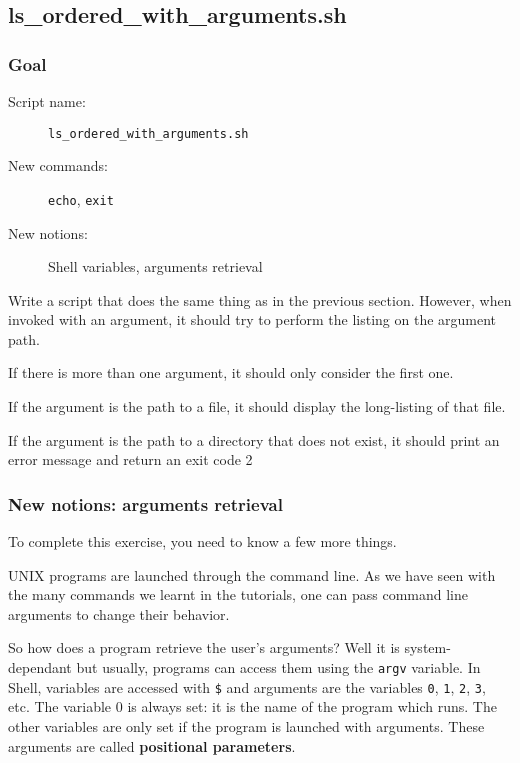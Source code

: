 \documentclass[12pt]{article}
\begin{document}
\subsection{ls\_ordered\_with\_arguments.sh}

\subsubsection{Goal}

\begin{description}
    \item[Script name:] \texttt{ls\_ordered\_with\_arguments.sh}
    \item[New commands:] \texttt{echo}, \texttt{exit}
    \item[New notions:] Shell variables, arguments retrieval

\end{description}

Write a script that does the same thing as in the previous section. However, when invoked with an argument, it should try to perform the listing on the argument path.

If there is more than one argument, it should only consider the first one.

If the argument is the path to a file, it should display the long-listing of that file.

If the argument is the path to a directory that does not exist, it should print an error message and return an exit code 2

\subsubsection{New notions: arguments retrieval}

To complete this exercise, you need to know a few more things.

UNIX programs are launched through the command line. As we have seen with the many commands we learnt in the tutorials, one can pass command line arguments to change their behavior.

So how does a program retrieve the user's arguments? Well it is system-dependant but usually, programs can access them using the \texttt{argv} variable. In Shell, variables are accessed with \texttt{\$} and arguments are the variables \texttt{0}, \texttt{1}, \texttt{2}, \texttt{3}, etc. The variable 0 is always set: it is the name of the program which runs. The other variables are only set if the program is launched with arguments. These arguments are called \textbf{positional parameters}.
\end{document}
